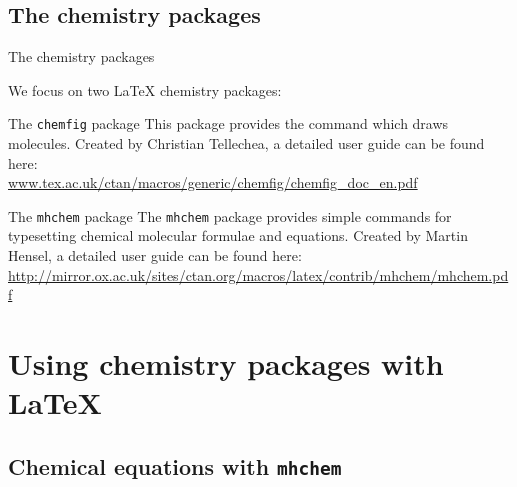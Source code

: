 \documentclass{beamer}
\begin{document}
\subsection{The chemistry packages}
\begin{frame}{The chemistry packages}

We focus on two \LaTeX{} chemistry packages:
\begin{block}{The \texttt{chemfig} package}
This pack­age pro­vides the com­mand which draws molecules. Created by Christian Tellechea, a detailed user guide can be found here:\\[0.4cm]
\small{\url{www.tex.ac.uk/ctan/macros/generic/chemfig/chemfig_doc_en.pdf}}
\end{block}
\begin{block}{The \texttt{mhchem} package}
The \texttt{mhchem} package provides simple commands for typesetting chemical molecular formulae and equations. Created by Martin Hensel, a detailed user guide can be found here:\\[0.4cm]
\small{\url{http://mirror.ox.ac.uk/sites/ctan.org/macros/latex/contrib/mhchem/mhchem.pdf}}
\end{block}

\end{frame}

\section{Using chemistry packages with \LaTeX{}}

\subsection{Chemical equations with \texttt{mhchem}}
\end{document}

